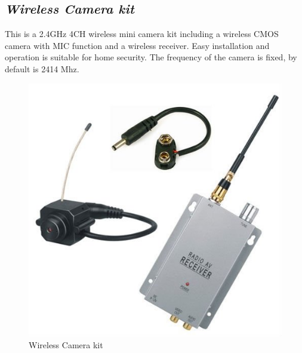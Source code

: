 \documentclass{report}
\begin{document}
\subsection*{\emph{Wireless Camera kit}}
This is a 2.4GHz 4CH wireless mini camera kit including a wireless CMOS camera with MIC function and a wireless receiver. Easy installation and operation is suitable for home security. The frequency of the camera is fixed, by default is 2414 Mhz.
\begin{figure}[h!]
\centering
\includegraphics[scale=0.25]{fig34.jpg}
\caption{Wireless Camera kit}
\label{fig23}
\end{figure}
\end{document}
